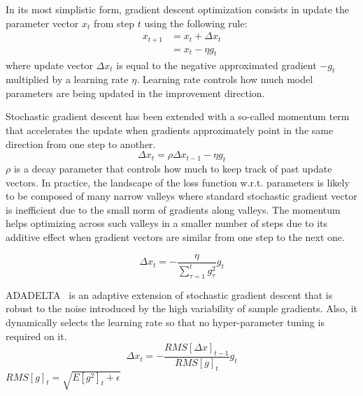         In its most simplistic form, gradient descent optimization consists in update the parameter vector $x_t$
        from step $t$ using the following rule:
        \begin{align}
            x_{t+1} & = x_t + \Delta x_t \\
            & = x_t - \eta g_t
        \end{align}
        where update vector $\Delta x_t$ is equal to the negative approximated gradient $-g_t$ multiplied by
        a learning rate $\eta$. Learning rate controls how much model parameters are being updated
        in the improvement direction.

        Stochastic gradient descent has been extended with a so-called momentum term that accelerates
        the update when gradients approximately point in the same direction from one step to another.
        \begin{equation}
            \Delta x_t = \rho \Delta x_{t-1} - \eta g_t
        \end{equation}
        $\rho$ is a decay parameter that controls how much to keep track of past update vectors.
        In practice, the landscape of the loss function w.r.t. parameters is likely to be composed of many
        narrow valleys where standard stochastic gradient vector is inefficient due to the small norm of gradients
        along valleys. The momentum helps optimizing across such valleys in a smaller number of steps
        due to its additive effect when gradient vectors are similar from one step to the next one.



        \begin{equation}
            \Delta x_t = - \frac{\eta}{\sum\limits_{\tau=1}^t g_{\tau}^2} g_t
        \end{equation}

        ADADELTA~\cite{DBLP:journals/corr/abs-1212-5701} is an adaptive extension of stochastic gradient descent
        that is robust to the noise introduced by the high variability of sample gradients. Also, it dynamically
        selects the learning rate so that no hyper-parameter tuning is required on it.
        \begin{equation}
            \Delta x_t = - \frac{RMS[\Delta x]_{t-1}}{RMS[g]_t} g_t
        \end{equation}
        $RMS[g]_t = \sqrt{E[g^2]_t + \epsilon}$



